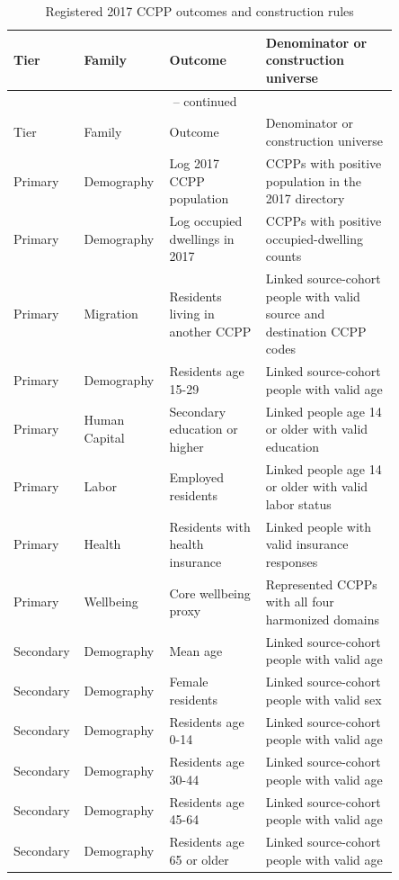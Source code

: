 \begingroup
\small
\begin{longtable}{p{0.10\linewidth}p{0.18\linewidth}p{0.24\linewidth}p{0.33\linewidth}}
\caption{Registered 2017 CCPP outcomes and construction rules}
\label{tab:rd_outcome_registry_2017_ccpp} \\
\toprule
Tier & Family & Outcome & Denominator or construction universe \\
\midrule
\endfirsthead
\multicolumn{4}{c}{\tablename\ \thetable{} -- continued} \\
\toprule
Tier & Family & Outcome & Denominator or construction universe \\
\midrule
\endhead
Primary & Demography & Log 2017 CCPP population & CCPPs with positive population in the 2017 directory \\
Primary & Demography & Log occupied dwellings in 2017 & CCPPs with positive occupied-dwelling counts \\
Primary & Migration & Residents living in another CCPP & Linked source-cohort people with valid source and destination CCPP codes \\
Primary & Demography & Residents age 15-29 & Linked source-cohort people with valid age \\
Primary & Human Capital & Secondary education or higher & Linked people age 14 or older with valid education \\
Primary & Labor & Employed residents & Linked people age 14 or older with valid labor status \\
Primary & Health & Residents with health insurance & Linked people with valid insurance responses \\
Primary & Wellbeing & Core wellbeing proxy & Represented CCPPs with all four harmonized domains \\
Secondary & Demography & Mean age & Linked source-cohort people with valid age \\
Secondary & Demography & Female residents & Linked source-cohort people with valid sex \\
Secondary & Demography & Residents age 0-14 & Linked source-cohort people with valid age \\
Secondary & Demography & Residents age 30-44 & Linked source-cohort people with valid age \\
Secondary & Demography & Residents age 45-64 & Linked source-cohort people with valid age \\
Secondary & Demography & Residents age 65 or older & Linked source-cohort people with valid age \\

\end{longtable}
